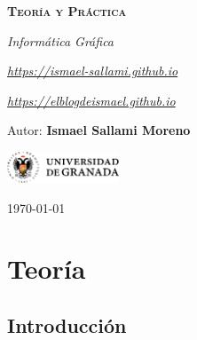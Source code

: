 \documentclass[12pt]{report} %
\begin{document}
\begin{titlepage}
    \begin{center}
        \vspace*{2cm}
        
        {\Huge \bfseries\scshape Teoría y Práctica \par}
        \vspace{0.5cm}
        {\Large \itshape Informática Gráfica \par}
        \vspace{0.5cm}
        {\small \itshape \href{https://ismael-sallami.github.io}{https://ismael-sallami.github.io} \par}
        {\small \itshape \href{https://elblogdeismael.github.io}{https://elblogdeismael.github.io} \par}


        \vfill
        
        {\LARGE Autor: \textbf{Ismael Sallami Moreno} \par}
        \vspace{0.3cm}
        
        \vspace{1cm}
        \includegraphics[width=0.25\textwidth]{../../../extraFiles/img/ugr.png} %
        \vspace{1cm}
        
        {\large \today}
    \end{center}
    
    \restoregeometry
\end{titlepage}


\thispagestyle{empty} %
\clearpage

\tableofcontents
\listoffigures
\clearpage

\listoftables
\clearpage
\thispagestyle{empty} %
\clearpage

\part{Teoría}

\hypertarget{introducciuxf3n}{%
\chapter{Introducción}\label{introducciuxf3n}}
\end{document}
